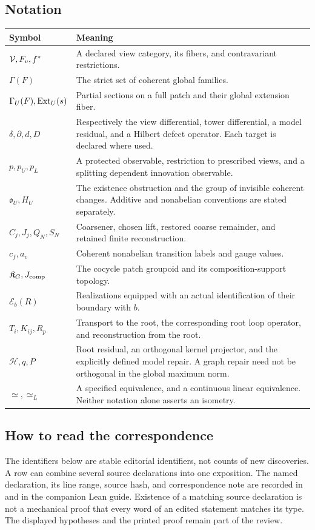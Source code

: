 \label{app:concordance}
\subsection{Notation}
\begin{longtable}{@{}p{.25\linewidth}p{.7\linewidth}@{}}
\toprule
Symbol & Meaning\\\midrule\endhead
\(\mathcal V,F_v,f^*\) & A declared view category, its fibers, and contravariant restrictions.\\
\(\Gamma(F)\) & The strict set of coherent global families.\\
\(\Gamma_U(F),\operatorname{Ext}_U(s)\) & Partial sections on a full patch and their global extension fiber.\\
\(\delta,\partial,d,D\) & Respectively the view differential, tower differential, a model residual, and a Hilbert defect operator. Each target is declared where used.\\
\(p,p_U,p_L\) & A protected observable, restriction to prescribed views, and a splitting dependent innovation observable.\\
\(\mathfrak o_U,H_U\) & The existence obstruction and the group of invisible coherent changes. Additive and nonabelian conventions are stated separately.\\
\(C_j,J_j,Q_N,S_N\) & Coarsener, chosen lift, restored coarse remainder, and retained finite reconstruction.\\
\(c_f,a_v\) & Coherent nonabelian transition labels and gauge values.\\
\(\mathfrak K_G,J_{\rm comp}\) & The cocycle patch groupoid and its composition-support topology.\\
\(\mathcal E_b(R)\) & Realizations equipped with an actual identification of their boundary with \(b\).\\
\(T_i,K_{ij},R_p\) & Transport to the root, the corresponding root loop operator, and reconstruction from the root.\\
\(\mathcal H,q,P\) & Root residual, an orthogonal kernel projector, and the explicitly defined model repair. A graph repair need not be orthogonal in the global maximum norm.\\
\(\simeq,\simeq_L\) & A specified equivalence, and a continuous linear equivalence. Neither notation alone asserts an isometry.\\
\bottomrule
\end{longtable}

\subsection{How to read the correspondence}
The identifiers below are stable editorial identifiers, not counts of new discoveries. A row can combine several source declarations into one exposition. The named declaration, its line range, source hash, and correspondence note are recorded in  and in the companion Lean guide. Existence of a matching source declaration is not a mechanical proof that every word of an edited statement matches its type. The displayed hypotheses and the printed proof remain part of the review.

